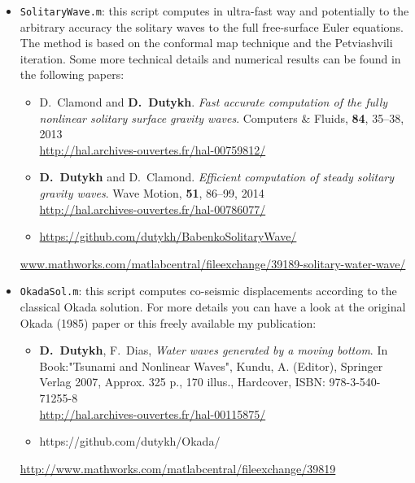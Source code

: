 \documentclass[final, a4paper, oneside, 12pt]{article}
\numberwithin{equation}{section}
\begin{document}
\begin{itemize}

  \item \texttt{SolitaryWave.m}: this script computes in ultra-fast way and potentially to the arbitrary accuracy the solitary waves to the full free-surface Euler equations. The method is based on the conformal map technique and the Petviashvili iteration. Some more technical details and numerical results can be found in the following papers:
  
  \begin{itemize}
    \item D.~Clamond and \textbf{D.~Dutykh}. \textit{Fast accurate computation of the fully nonlinear solitary surface gravity waves}. Computers \& Fluids, \textbf{84}, 35--38, 2013 \\
  \url{http://hal.archives-ouvertes.fr/hal-00759812/}
  
    \item \textbf{D.~Dutykh} and D.~Clamond. \textit{Efficient computation of steady solitary gravity waves}. Wave Motion, \textbf{51}, 86--99, 2014 \\
  \url{http://hal.archives-ouvertes.fr/hal-00786077/}
  \end{itemize}
  
  \begin{itemize}
    \item \url{https://github.com/dutykh/BabenkoSolitaryWave/}
  \end{itemize}
  \url{www.mathworks.com/matlabcentral/fileexchange/39189-solitary-water-wave/}

\end{itemize}

\begin{itemize}

  \item \texttt{OkadaSol.m}: this script computes co-seismic displacements according to the classical Okada solution. For more details you can have a look at the original Okada (1985) paper or this freely available my publication:
  \begin{itemize}
    \item \textbf{D.~Dutykh}, F.~Dias, \textit{Water waves generated by a moving bottom}. In Book:"Tsunami and Nonlinear Waves", Kundu, A. (Editor), Springer Verlag 2007, Approx. 325 p., 170 illus., Hardcover, ISBN: 978-3-540-71255-8 \\
    \url{http://hal.archives-ouvertes.fr/hal-00115875/}
  \end{itemize}
  
  \begin{itemize}
    \item https://github.com/dutykh/Okada/
  \end{itemize}
  \url{http://www.mathworks.com/matlabcentral/fileexchange/39819}
  
\end{itemize}
\end{document}
